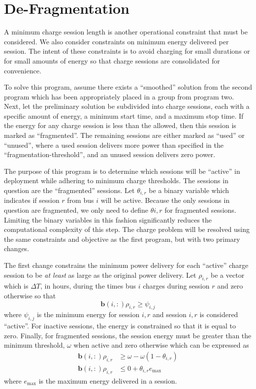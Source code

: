 \section{De-Fragmentation}
A minimum charge session length is another operational constraint that must be considered. We also consider constraints on minimum energy delivered per session. The intent of these constraints is to avoid charging for small durations or for small amounts of energy so that charge sessions are consolidated for convenience. 
\par To solve this program, assume there exists a ``smoothed'' solution from the second program which has been appropriately placed in a group from program two. Next, let the preliminary solution be subdivided into charge sessions, each with a specific amount of energy, a minimum start time, and a maximum stop time. If the energy for any charge session is less than the allowed, then this session is marked as ``fragmented''.  The remaining sessions are either marked as ``used'' or ``unused'', where a used session delivers more power than specified in the ``fragmentation-threshold'', and an unused session delivers zero power. 
\par The purpose of this program is to determine which sessions will be ``active'' in deployment while adhering to minimum charge thresholds. The sessions in question are the ``fragmented'' sessions.  Let $\theta_{i,r}$ be a binary variable which indicates if session $r$ from bus $i$ will be active. Because the only sessions in question are fragmented, we only need to define $\theta{i,r}$ for fragmented sessions. Limiting the binary variables in this fashion significantly reduces the computational complexity of this step.  The charge problem will be resolved using the same constraints and objective as the first program, but with two primary changes.
\par The first change constrains the minimum power delivery for each ``active'' charge session to be {\it at least} as large as the original power delivery. Let $\rho_{i,r}$ be a vector which is $\Delta T$, in hours, during the times bus $i$ charges during session $r$ and zero otherwise so that  
\begin{equation}\label{eqn:defragmentation:active}
	\mathbf{b}(i,:)\rho_{i,r} \ge \psi_{i,j}
\end{equation}
where $\psi_{i,j}$ is the minimum energy for session $i,r$ and session $i,r$ is considered ``active''. For inactive sessions, the energy is constrained so that it is equal to zero. Finally, for fragmented sessions, the session energy must be greater than the minimum threshold, $\omega$ when active and zero otherwise which can be expressed as
\begin{equation}\begin{aligned}
	\mathbf{b}(i,:)\rho_{i,r} &\ge \omega - \omega(1 - \theta_{i,r}) \\
	\mathbf{b}(i,:)\rho_{i,r} &\le 0 + \theta_{i,r}e_{\text{max}}
\end{aligned}\end{equation}
where $e_{\text{max}}$ is the maximum energy delivered in a session. 
